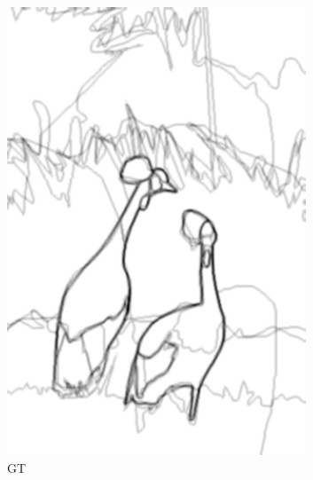 \documentclass[a4paper]{ctexart}
\begin{document}
\begin{figure}[htb]
\begin{subfigure}{0.2\textwidth}
			\includegraphics[width=\linewidth]{picture/LLIE/RCF/GT}
			\captionsetup{font=scriptsize}
			\caption{GT}
			\label{fig: RCF_GT}
		\end{subfigure}
		\begin{subfigure}{0.2\textwidth}

\end{subfigure}
\end{figure}
\end{document}

